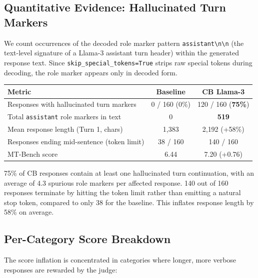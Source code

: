 \subsection{Quantitative Evidence: Hallucinated Turn Markers}

We count occurrences of the decoded role marker pattern \texttt{assistant\textbackslash n\textbackslash n} (the text-level signature of a Llama-3 assistant turn header) within the generated response text. Since \texttt{skip\_special\_tokens=True} strips raw special tokens during decoding, the role marker appears only in decoded form.

\begin{center}
\setlength{\tabcolsep}{8pt}
\renewcommand{\arraystretch}{1.15}
\begin{tabular}{@{}lcc@{}}
\toprule
\textbf{Metric} & \textbf{Baseline} & \textbf{CB Llama-3} \\
\midrule
Responses with hallucinated turn markers & 0 / 160 (0\%) & 120 / 160 (\textbf{75\%}) \\
Total \texttt{assistant} role markers in text & 0 & \textbf{519} \\
Mean response length (Turn 1, chars) & 1{,}383 & 2{,}192 (+58\%) \\
Responses ending mid-sentence (token limit) & 38 / 160 & 140 / 160 \\
MT-Bench score & 6.44 & 7.20 (+0.76) \\
\bottomrule
\end{tabular}
\renewcommand{\arraystretch}{1.0}
\end{center}

75\% of CB responses contain at least one hallucinated turn continuation, with an average of 4.3 spurious role markers per affected response. 140 out of 160 responses terminate by hitting the token limit rather than emitting a natural stop token, compared to only 38 for the baseline. This inflates response length by 58\% on average.

\subsection{Per-Category Score Breakdown}

The score inflation is concentrated in categories where longer, more verbose responses are rewarded by the judge:

